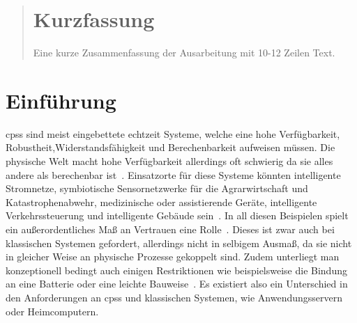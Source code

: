 \documentclass[final,bibliography=totocnumbered]{include/sikseminar}
\begin{document}
\makeTitle

\makeAuthor

\date{Datum des Vortrags \todo}

\subject{Seminar Cyber-Physical Systems}

\maketitle

\begin{abstract}
\section*{Kurzfassung}
Eine kurze Zusammenfassung der Ausarbeitung mit 10-12 Zeilen Text.
\end{abstract}
\thispagestyle{empty}
\newpage
\tableofcontents
\newpage

\section{Einführung}\label{sec:intro}
\glspl{cps} sind meist eingebettete echtzeit Systeme, welche eine hohe Verfügbarkeit, Robustheit,Widerstandsfähigkeit und Berechenbarkeit aufweisen müssen.
Die physische Welt macht hohe Verfügbarkeit allerdings oft schwierig da sie alles andere als berechenbar ist~\cite{Lee08,SGL+08}.
Einsatzorte für diese Systeme könnten intelligente Stromnetze, symbiotische Sensornetzwerke für die Agrarwirtschaft und Katastrophenabwehr, medizinische oder assistierende Geräte, intelligente Verkehrssteuerung und intelligente Gebäude sein~\cite{RLS+10}.
In all diesen Beispielen spielt ein außerordentliches Maß an Vertrauen eine Rolle~\cite{SGL+08}.
Dieses ist zwar auch bei klassischen Systemen gefordert, allerdings nicht in selbigem Ausmaß, da sie nicht in gleicher Weise an physische Prozesse gekoppelt sind.
Zudem unterliegt man konzeptionell bedingt auch einigen Restriktionen wie beispielsweise die Bindung an eine Batterie oder eine leichte Bauweise~\cite{YWY+17}.
Es existiert also ein Unterschied in den Anforderungen an \glspl{cps} und klassischen Systemen, wie Anwendungsservern oder Heimcomputern.
\end{document}
